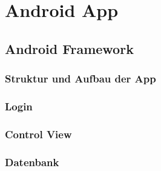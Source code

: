 
\chapter{Android App}
\section{Android Framework}
\subsection{Struktur und Aufbau der App}
\subsection{Login}
\subsection{Control View}
\subsection{Datenbank}